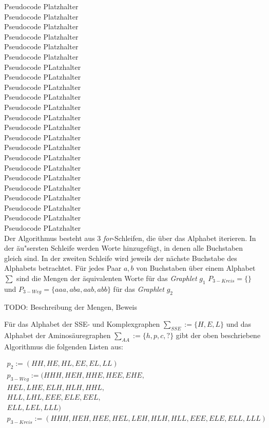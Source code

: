 \documentclass{report}
\begin{document}
Pseudocode Platzhalter \\
Pseudocode Platzhalter \\
Pseudocode Platzhalter \\
Pseudocode Platzhalter \\
Pseudocode Platzhalter \\
Pseudocode Platzhalter \\
Pseudocode PLatzhalter \\
Pseudocode PLatzhalter \\
Pseudocode PLatzhalter \\
Pseudocode PLatzhalter \\
Pseudocode PLatzhalter \\
Pseudocode PLatzhalter \\
Pseudocode PLatzhalter \\
Pseudocode PLatzhalter \\
Pseudocode PLatzhalter \\
Pseudocode PLatzhalter \\
Pseudocode PLatzhalter \\
Pseudocode PLatzhalter \\
Pseudocode PLatzhalter \\
Pseudocode PLatzhalter \\
Pseudocode PLatzhalter \\
Pseudocode PLatzhalter \\
Pseudocode PLatzhalter \\


Der Algorithmus besteht aus 3 \textit{for}-Schleifen, die \"uber das Alphabet iterieren. In der \"au"sersten Schleife werden Worte hinzugef\"ugt, in denen alle Buchstaben gleich sind.
In der zweiten Schleife wird jeweils der n\"achste Buchstabe des Alphabets betrachtet. F\"ur jedes Paar $a, b$ von Buchstaben \"uber einem Alphabet $\sum$ sind die Mengen der \"aquivalenten Worte f\"ur das \textit{Graphlet} $g_1$ $P_{3-Kreis} = \{ \}$ und $P_{3-Weg} = \{ aaa, aba, aab, abb  \}$ f\"ur das \textit{Graphlet} $g_2$

TODO: Beschreibung der Mengen, Beweis



F\"ur das Alphabet der SSE- und Komplexgraphen $ \sum_{SSE} := \{ H, E, L \} $ und das Alphabet der Aminos\"auregraphen $ \sum_{AA} := \{ h, p, c, ? \} $ gibt der oben beschriebene Algorithmus die folgenden Listen aus:


\begin{subequations}
\begin{align}
p_2 :=       (HH, HE, HL, EE, EL, LL) \\
p_{3-Weg}   := (HHH, HEH, HHE, HEE, EHE, \\
                HEL, LHE, ELH, HLH, HHL, \\
                HLL, LHL, EEE, ELE, EEL, \\
                ELL, LEL, LLL) \\
p_{3-Kreis} := (HHH, HEH, HEE, HEL, LEH,
                HLH, HLL, EEE, ELE, ELL, LLL) \\
\end{align}
\end{subequations}
\end{document}

